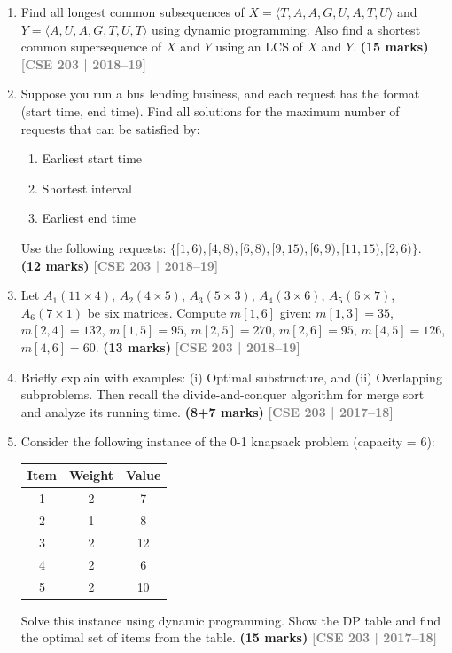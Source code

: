 \documentclass[12pt,a3paper]{article}
\newcommand{\yr}[1]{\hfill\textcolor{gray}{\small\textbf{[#1]}}}
\newcommand{\mk}[1]{\textcolor{orange!70!black}{\small\textbf{(#1 marks)}}}
\begin{document}
\begin{enumerate}
\item Find all longest common subsequences of $X = \langle T,A,A,G,U,A,T,U \rangle$ and $Y = \langle A,U,A,G,T,U,T \rangle$ using dynamic programming. Also find a shortest common supersequence of $X$ and $Y$ using an LCS of $X$ and $Y$. \mk{15}
\yr{CSE 203 | 2018--19}

\item Suppose you run a bus lending business, and each request has the format (start time, end time). Find all solutions for the maximum number of requests that can be satisfied by:
\begin{enumerate}
  \item Earliest start time
  \item Shortest interval
  \item Earliest end time
\end{enumerate}
Use the following requests: $\{[1,6),[4,8),[6,8),[9,15),[6,9),[11,15),[2,6)\}$.\\
\mk{12}
\yr{CSE 203 | 2018--19}

\item Let $A_1(11\times4)$, $A_2(4\times5)$, $A_3(5\times3)$, $A_4(3\times6)$, $A_5(6\times7)$, $A_6(7\times1)$ be six matrices. Compute $m[1,6]$ given: $m[1,3]=35$, $m[2,4]=132$, $m[1,5]=95$, $m[2,5]=270$, $m[2,6]=95$, $m[4,5]=126$, $m[4,6]=60$. \mk{13}
\yr{CSE 203 | 2018--19}

\item Briefly explain with examples: (i) Optimal substructure, and (ii) Overlapping subproblems. Then recall the divide-and-conquer algorithm for merge sort and analyze its running time. \mk{8+7}
\yr{CSE 203 | 2017--18}

\item Consider the following instance of the 0-1 knapsack problem (capacity = 6):
\begin{center}
\begin{tabular}{ccc}
\toprule
Item & Weight & Value \\
\midrule
1 & 2 & 7 \\
2 & 1 & 8 \\
3 & 2 & 12 \\
4 & 2 & 6 \\
5 & 2 & 10 \\
\bottomrule
\end{tabular}
\end{center}
Solve this instance using dynamic programming. Show the DP table and find the optimal set of items from the table. \mk{15}
\yr{CSE 203 | 2017--18}


\end{enumerate}
\end{document}
